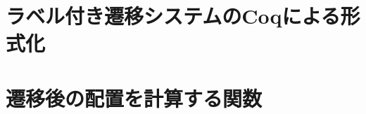 \chapter{ラベル付き遷移システムのCoqによる形式化}
\label{appendix:trans}


\chapter{遷移後の配置を計算する関数}
\label{appendix:calc-trans}

